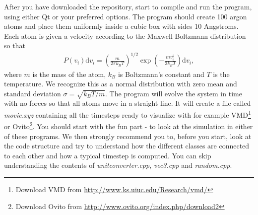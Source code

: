 \documentclass[11pt,a4wide]{article}
\newcommand{\dm}[1]{\mathrm{d}#1}
\begin{document}
After you have downloaded the repository, start to compile and run the program, using either Qt or your preferred options. The program should create 100 argon atoms and place them uniformly inside a cubic box with sides 10 Angstroms. Each atom is given a velocity according to the Maxwell-Boltzmann distribution so that
\begin{align}
	\label{eq:maxwell_boltzmann}
	P(v_i)\dm{v_i} = \left(\frac{m}{2\pi k_B T}\right)^{1/2} \exp\left(-\frac{m v_i^2}{2k_B T}\right) \dm{v_i},
\end{align}
where $m$ is the mass of the atom, $k_B$ is Boltzmann's constant and $T$ is the temperature. We recognize this as a normal distribution with zero mean and standard deviation $\sigma = \sqrt{k_B T/m}$. The program will evolve the system in time with no forces so that all atoms move in a straight line. It will create a file called \textit{movie.xyz} containing all the timesteps ready to visualize with for example VMD\footnote{Download VMD from \url{http://www.ks.uiuc.edu/Research/vmd/}} or Ovito\footnote{Download Ovito from \url{http://www.ovito.org/index.php/download2}}. You should start with the fun part - to look at the simulation in either of these programs. We then strongly recommend you to, before you start, look at the code structure and try to understand how the different classes are connected to each other and how a typical timestep is computed. You can skip understanding the contents of \textit{unitconverter.cpp}, \textit{vec3.cpp} and \textit{random.cpp}.
\end{document}
